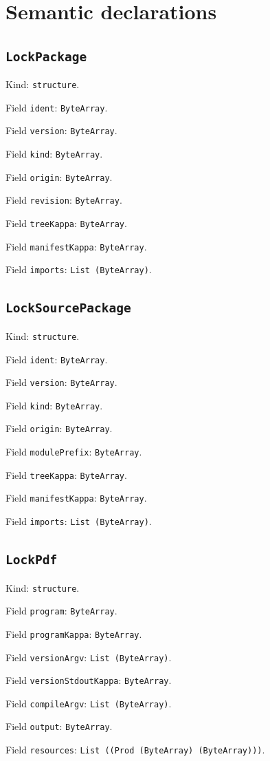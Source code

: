 \documentclass[11pt]{article}
\begin{document}
\section*{Semantic declarations}
\subsection*{\texttt{LockPackage}}
\noindent Kind: \texttt{structure}.\par
\noindent Field \texttt{ident}: \texttt{ByteArray}.\par
\noindent Field \texttt{version}: \texttt{ByteArray}.\par
\noindent Field \texttt{kind}: \texttt{ByteArray}.\par
\noindent Field \texttt{origin}: \texttt{ByteArray}.\par
\noindent Field \texttt{revision}: \texttt{ByteArray}.\par
\noindent Field \texttt{treeKappa}: \texttt{ByteArray}.\par
\noindent Field \texttt{manifestKappa}: \texttt{ByteArray}.\par
\noindent Field \texttt{imports}: \texttt{List (ByteArray)}.\par
\subsection*{\texttt{LockSourcePackage}}
\noindent Kind: \texttt{structure}.\par
\noindent Field \texttt{ident}: \texttt{ByteArray}.\par
\noindent Field \texttt{version}: \texttt{ByteArray}.\par
\noindent Field \texttt{kind}: \texttt{ByteArray}.\par
\noindent Field \texttt{origin}: \texttt{ByteArray}.\par
\noindent Field \texttt{modulePrefix}: \texttt{ByteArray}.\par
\noindent Field \texttt{treeKappa}: \texttt{ByteArray}.\par
\noindent Field \texttt{manifestKappa}: \texttt{ByteArray}.\par
\noindent Field \texttt{imports}: \texttt{List (ByteArray)}.\par
\subsection*{\texttt{LockPdf}}
\noindent Kind: \texttt{structure}.\par
\noindent Field \texttt{program}: \texttt{ByteArray}.\par
\noindent Field \texttt{programKappa}: \texttt{ByteArray}.\par
\noindent Field \texttt{versionArgv}: \texttt{List (ByteArray)}.\par
\noindent Field \texttt{versionStdoutKappa}: \texttt{ByteArray}.\par
\noindent Field \texttt{compileArgv}: \texttt{List (ByteArray)}.\par
\noindent Field \texttt{output}: \texttt{ByteArray}.\par
\noindent Field \texttt{resources}: \texttt{List ((Prod (ByteArray) (ByteArray)))}.\par
\end{document}
